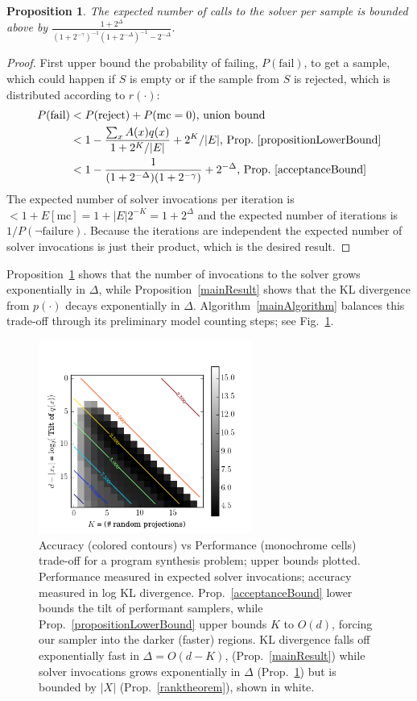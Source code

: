 \documentclass{article}
\newtheorem{proposition}{Proposition}
\begin{document}
  \begin{proposition}\label{proposition:tt}
    The expected number of calls to the solver per sample is bounded above by $\frac{1 + 2^\Delta}{(1 + 2^{ - \gamma})^{-1}(1 + 2^{ - \Delta})^{-1} - 2^{ - \Delta}}.$
  \end{proposition}
  \begin{proof}
    First upper bound the probability of failing, $P(\text{fail})$, to get a sample,
    which could happen if $S$  is empty or if the sample from $S$ is rejected,
    which is distributed according to $r(\cdot )$:
    \begin{align}
      P(\text{fail})& < P(\text{reject}) + P(\text{mc} = 0) \text{, union bound}\\
      & < 1 - \frac{\sum_x A(x)q(x)}{1 + 2^K/|E|} + 2^K/|E| \text{, Prop.~\ref{propositionLowerBound}}\\
      & < 1 - \frac{1}{(1 + 2^{ - \Delta})(1 + 2^{ - \gamma})} + 2^{ - \Delta}\text{, Prop.~\ref{acceptanceBound}}
    \end{align}
    The expected number of solver invocations per iteration is $< 1+E[\text{mc}] = 1 + |E|2^{-K} = 1 + 2^{\Delta}$
    and the expected number of iterations is $1/P(\neg\text{failure})$.
    Because the iterations are independent the expected number of solver invocations is just their product, which is the desired result.
  \end{proof}
  Proposition~\ref{proposition:tt} shows that the number of invocations to the solver grows exponentially in $\Delta$, while Proposition~\ref{mainResult} shows that the KL divergence from $p(\cdot )$ decays exponentially in $\Delta$.
  Algorithm~\ref{mainAlgorithm} balances this trade-off through its preliminary model counting steps; see Fig.~\ref{heat}.
  \begin{figure}
    \includegraphics[width=7cm]{trade-off.png}
    \caption{Accuracy (colored contours) vs Performance (monochrome cells) trade-off for a program synthesis problem; upper bounds plotted. Performance measured in expected solver invocations; accuracy measured in log KL divergence. Prop.~\ref{acceptanceBound} lower bounds the tilt of performant samplers, while  Prop.~\ref{propositionLowerBound} upper bounds $K$ to $O(d)$, forcing our sampler into the darker (faster) regions.  KL divergence falls off exponentially fast in $\Delta = O(d - K)$, (Prop.~\ref{mainResult}) while solver invocations grows exponentially in $\Delta$ (Prop.~\ref{proposition:tt}) but is bounded by $|X|$ (Prop.~\ref{ranktheorem}), shown in white.}\label{heat}
    \end{figure}
     
\end{document}
